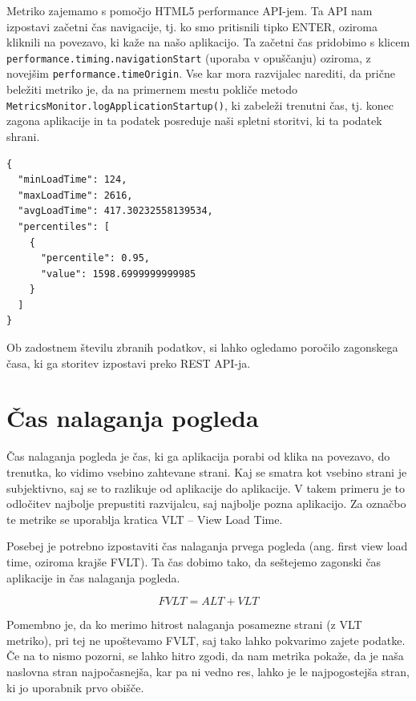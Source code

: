 \documentclass[a4paper, 12pt]{book}
\begin{document}
Metriko zajemamo s pomočjo HTML5 performance API-jem. Ta API nam izpostavi začetni čas navigacije, tj. ko smo pritisnili tipko ENTER, oziroma kliknili na povezavo, ki kaže na našo aplikacijo. Ta začetni čas pridobimo s klicem \verb|performance.timing.navigationStart| (uporaba v opuščanju) oziroma, z novejšim \verb|performance.timeOrigin|. Vse kar mora razvijalec narediti, da prične beležiti metriko je, da na primernem mestu pokliče metodo \\ \verb|MetricsMonitor.logApplicationStartup()|, ki zabeleži trenutni čas, tj. konec zagona aplikacije in ta podatek posreduje naši spletni storitvi, ki ta podatek shrani.

\begin{lstlisting}[label=code:app_startup_report, caption=Poročilo zagonskega časa aplikacije]
{
  "minLoadTime": 124,
  "maxLoadTime": 2616,
  "avgLoadTime": 417.30232558139534,
  "percentiles": [
    {
      "percentile": 0.95,
      "value": 1598.6999999999985
    }
  ]
}
\end{lstlisting}

Ob zadostnem številu zbranih podatkov, si lahko ogledamo poročilo zagonskega časa, ki ga storitev izpostavi preko REST API-ja.


\section{Čas nalaganja pogleda}
\label{ch2:sec2}

Čas nalaganja pogleda je čas, ki ga aplikacija porabi od klika na povezavo, do trenutka, ko vidimo vsebino zahtevane strani. Kaj se smatra kot vsebino strani je subjektivno, saj se to razlikuje od aplikacije do aplikacije. V takem primeru je to odločitev najbolje prepustiti razvijalcu, saj najbolje pozna aplikacijo. Za označbo te metrike se uporablja kratica VLT – View Load Time.

Posebej je potrebno izpostaviti čas nalaganja prvega pogleda (ang. first view load time, oziroma krajše FVLT). Ta čas dobimo tako, da seštejemo zagonski čas aplikacije in čas nalaganja pogleda.

\begin{equation}
\label{eq:fvlt}
FVLT = ALT + VLT
\end{equation}

Pomembno je, da ko merimo hitrost nalaganja posamezne strani (z VLT metriko), pri tej ne upoštevamo FVLT, saj tako lahko pokvarimo zajete podatke. Če na to nismo pozorni, se lahko hitro zgodi, da nam metrika pokaže, da je naša naslovna stran najpočasnejša, kar pa ni vedno res, lahko je le najpogostejša stran, ki jo uporabnik prvo obišče.
\end{document}
